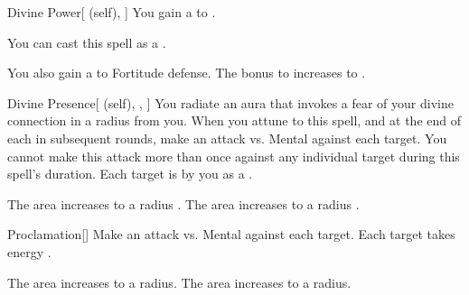 \lowercase{\hypertarget{spell:Divine Power}{}}\label{spell:Divine Power}
\begin{attuneability}[Rank 3]{\hypertarget{spell:Divine Power}{Divine Power}}[ (self), ]
You gain a   to .

You can cast this spell as a .

\rankline
{} You also gain a   to Fortitude defense.
 The bonus to  increases to .
\end{attuneability}
\vspace{0.25em}



\lowercase{\hypertarget{spell:Divine Presence}{}}\label{spell:Divine Presence}
\begin{attuneability}[Rank 3]{\hypertarget{spell:Divine Presence}{Divine Presence}}[ (self), , ]
You radiate an aura that invokes a fear of your divine connection in a \areamed radius  from you.
When you attune to this spell, and at the end of each  in subsequent rounds, make an attack vs. Mental against each target.
You cannot make this attack more than once against any individual target during this spell's duration.
\hit Each target is  by you as a .

\rankline
{} The area increases to a \arealarge radius .
 The area increases to a \areahuge radius .
\end{attuneability}
\vspace{0.25em}



\lowercase{\hypertarget{spell:Proclamation}{}}\label{spell:Proclamation}
\begin{freeability}[Rank 3]{\hypertarget{spell:Proclamation}{Proclamation}}[]
Make an attack vs. Mental against each target.
\hit Each target takes energy .

\rankline
{} The area increases to a \arealarge radius.
 The area increases to a \areahuge radius.
\end{freeability}
\vspace{0.25em}



